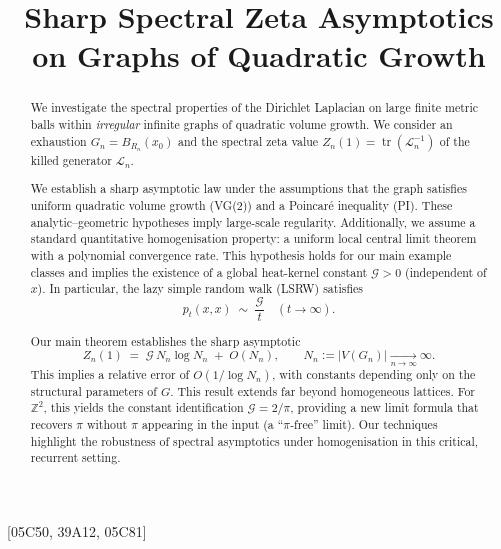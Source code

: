 \documentclass{article}
\numberwithin{equation}{section}
\theoremstyle{definition}
\theoremstyle{remark}
\newcommand{\cG}{\mathcal{G}}
\DeclareMathOperator{\tr}{tr}
\newcommand{\LL}{\mathcal{L}}
\begin{document}
\title{Sharp Spectral Zeta Asymptotics on Graphs of Quadratic Growth}




[05C50, 39A12, 05C81]

\begin{abstract}
We investigate the spectral properties of the Dirichlet Laplacian on large finite metric balls within \emph{irregular} infinite graphs of quadratic volume growth.
We consider an exhaustion $G_n=B_{R_n}(x_0)$ and the spectral zeta value
$Z_n(1)=\tr(\LL_n^{-1})$ of the killed generator $\LL_n$.

We establish a sharp asymptotic law under the assumptions that the graph satisfies uniform quadratic volume growth (VG(2)) and a Poincaré inequality (PI). These analytic–geometric hypotheses imply large-scale regularity. Additionally, we assume a standard quantitative homogenisation property: a uniform local central limit theorem with a polynomial convergence rate. This hypothesis holds for our main example classes and implies the existence of a global heat-kernel constant $\cG>0$ (independent of $x$). In particular, the lazy simple random walk (LSRW) satisfies 
\[
  p_t(x,x)\;\sim\;\frac{\cG}{t}\quad(t\to\infty).
\]

Our main theorem establishes the sharp asymptotic
\[
  Z_n(1)\;=\;\cG\,N_n\log N_n\;+\; O(N_n),\qquad N_n:=|V(G_n)|\xrightarrow[n\to\infty]{}\infty.
\]
This implies a relative error of $O(1/\log N_n)$, with constants depending only on the structural parameters of $G$.
This result extends far beyond homogeneous lattices.
For $\mathbb Z^2$, this yields the constant identification $\cG = 2/\pi$, providing a new limit formula that recovers $\pi$ without $\pi$ appearing in the input (a ``$\pi$-free'' limit).
Our techniques highlight the robustness of spectral asymptotics under homogenisation in this critical, recurrent setting.
\end{abstract}

\maketitle
\end{document}
